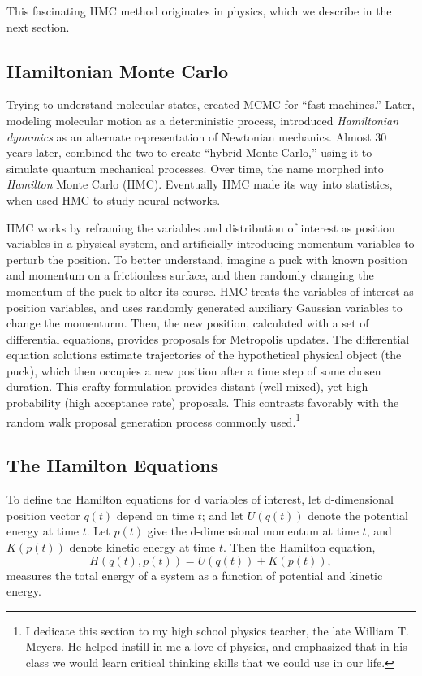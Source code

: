 This fascinating HMC method originates in physics, which we describe in the next section.

\subsection{Hamiltonian Monte Carlo} 

Trying to understand molecular states, \cite{Metropolis1953} created MCMC for ``fast machines.'' Later, modeling molecular motion as a deterministic process, \cite{Alder1959} introduced {\it Hamiltonian dynamics} as an alternate representation of Newtonian mechanics. Almost 30 years later, \cite{Duane1987} combined the two to create ``hybrid Monte Carlo,'' using it to simulate quantum mechanical processes. Over time, the name morphed into {\it Hamilton} Monte Carlo (HMC). Eventually HMC made its way into statistics, when \cite{Neal1996} used HMC to study neural networks.

HMC works by reframing the variables and distribution of interest as position variables in a physical system, and artificially introducing momentum variables to perturb the position. To better understand, imagine a puck with known position and momentum on a frictionless surface, and then randomly changing the momentum of the puck to alter its course. HMC treats the variables of interest as position variables, and uses randomly generated auxiliary Gaussian variables to change the momenturm. Then, the new position, calculated with a set of differential equations, provides proposals for Metropolis updates. The differential equation solutions estimate trajectories of the hypothetical physical object (the puck), which then occupies a new position after a time step of some chosen duration. This crafty formulation provides distant (well mixed), yet high probability (high acceptance rate) proposals. This contrasts favorably with the random walk proposal generation process commonly used.\footnote{I dedicate this section to my high school physics teacher, the late William T. Meyers. He helped instill in me a love of physics, and emphasized that in his class we would learn critical thinking skills that we could use in our life.}

\subsection{The Hamilton Equations} %

To define the Hamilton equations for d variables of interest, let d-dimensional position vector $q(t)$ depend on time $t$; and let $U(q(t))$ denote the potential energy at time $t$. Let $p(t)$ give the d-dimensional momentum at time $t$, and $K(p(t))$ denote kinetic energy at time $t$. Then the Hamilton equation,
\begin{equation}
H(q(t),p(t)) = U(q(t)) + K(p(t)),
\end{equation}
measures the total energy of a system as a function of potential and kinetic energy. 

